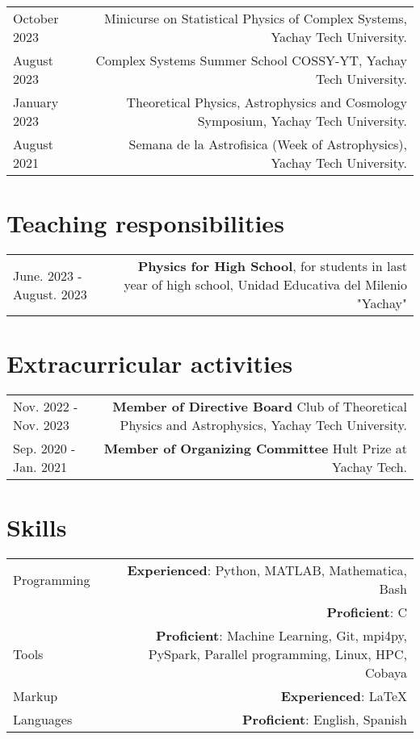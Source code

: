\documentclass{article}
\begin{document}
\begin{tabular}{L!{\vrule}R}
  October 2023  & Minicurse on Statistical Physics of Complex Systems, Yachay Tech University. \\
  August 2023  & Complex Systems Summer School COSSY-YT, Yachay Tech University. \\
  January 2023 & Theoretical Physics, Astrophysics and Cosmology Symposium, Yachay Tech University.\\
  August 2021 & Semana de la Astrofisica (Week of Astrophysics), Yachay Tech University.\\
\end{tabular}
\section*{Teaching responsibilities}

\begin{tabular}{L!{\vrule}R}

  June. 2023 - August. 2023 & \textbf{Physics for High School}, for students in last year of high school, Unidad Educativa del Milenio "Yachay"\\

\end{tabular}


\section*{Extracurricular activities}
\begin{tabular}{L!{\vrule}R}

  Nov. 2022 - Nov. 2023 & \textbf{Member of Directive Board} Club of Theoretical Physics and Astrophysics, Yachay Tech University. \\

  Sep. 2020 - Jan. 2021 & \textbf{Member of Organizing Committee} Hult Prize at Yachay Tech. \\
\end{tabular}

\section*{Skills}

\begin{tabular}{L!{\vrule}R}
	Programming & \textbf{Experienced}: Python, MATLAB, Mathematica, Bash \\
              &\textbf{Proficient}: C \\
  Tools & \textbf{Proficient}: Machine Learning, Git, mpi4py, PySpark, Parallel programming, Linux, HPC, Cobaya\\
	Markup & \textbf{Experienced}: LaTeX\\
	Languages & \textbf{Proficient}: English, Spanish\\
\end{tabular}
\end{document}
